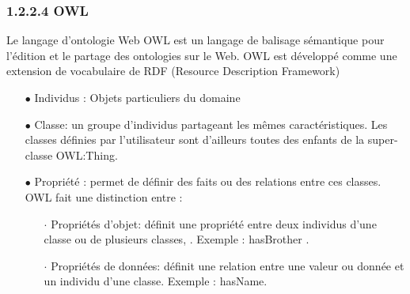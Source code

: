                 \subsubsection{1.2.2.4 OWL}
                    Le langage d'ontologie Web OWL est un langage de balisage sémantique pour l'édition et le partage des ontologies sur le Web. OWL est développé comme une extension de vocabulaire de RDF (Resource Description Framework)
                    \begin{itemize}
                    \item[\quad $\bullet$]Individus : Objets particuliers du domaine
                    \item[\quad $\bullet$]Classe: un groupe d'individus partageant les mêmes caractéristiques. Les classes définies par l'utilisateur sont d'ailleurs toutes des enfants de la  super-classe OWL:Thing.
                    \item[\quad $\bullet$]Propriété : permet de définir des faits ou des relations entre ces classes. OWL fait une distinction entre :
                        \begin{itemize}
                        \item[\quad $\cdot$]Propriétés d'objet: définit une propriété entre deux individus d'une classe ou de plusieurs classes, . Exemple : hasBrother .
                        \item[\quad $\cdot$]Propriétés de données: définit une relation entre une valeur ou donnée et un individu d'une classe. Exemple : hasName.
                        \end{itemize}

                    \end{itemize}
